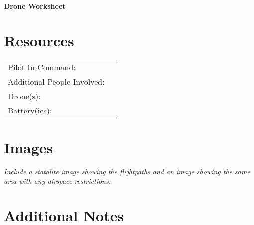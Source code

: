 \documentclass[./main.tex]{subfiles}
\begin{document}
\begin{center}
\Large\textbf{Drone Worksheet}
\end{center}

\section*{Resources}
\begin{tabularx}{\textwidth}{@{}lX@{}}
Pilot In Command: & \hrulefill \\[2ex]
Additional People Involved: & \hrulefill \\[2ex]
Drone(s): & \hrulefill \\[2ex]
Battery(ies): & \hrulefill \\[2ex]
\end{tabularx}

\section*{Images}
\emph{Include a statalite image showing the flightpaths and an image showing the same area with any airspace restrictions. }

\vspace{8cm}

\section*{Additional Notes}


\end{document}
